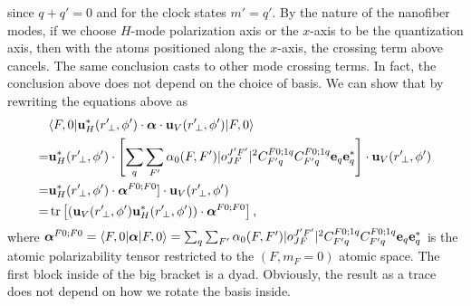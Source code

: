 \documentclass[preprint,aps,pra,onecolumn]{revtex4-1} %
\renewcommand{\tensor}[1]{\boldsymbol{#1}}
\begin{document}
since $q+q' = 0$ and for the clock states $m' = q'$. By the nature of the nanofiber modes, if we choose 
$H$-mode polarization axis or the $x$-axis to be the quantization axis, then with the atoms positioned 
along the $x$-axis, the crossing term above cancels. The same conclusion casts to other mode crossing 
terms. In fact, the conclusion above does not depend on the choice of basis. We can show that by 
rewriting the equations above as
\begin{align}
&\bra{F,0} \mathbf{u}^*_H(r^\prime\!_\perp, \phi') \cdot \tensor{\alpha} \cdot 
	\mathbf{u}_{V}(r^\prime\!_\perp, \phi') \ket{F,0}\nonumber\\
=& \mathbf{u}^*_H(r^\prime\!_\perp, 
 \phi')\cdot \left[  \sum_{q} \sum_{F'}\alpha_0(F,F') 
   |o^{J'F'}_{JF} |^2 C^{F 	0;1q}_{F' q} C^{F 0;1q}_{F' q}
     	  \mathbf{e}_q \mathbf{e}^*_{q}  \right]\cdot \mathbf{u}_V(r^\prime\!_\perp, \phi') \\
=& \mathbf{u}^*_H(r^\prime\!_\perp,  \phi')\cdot \boldsymbol{\alpha}^{F0;F0}]\cdot 
\mathbf{u}_V(r^\prime\!_\perp, \phi') \\
=& \tr\left[ \left(  \mathbf{u}_V(r^\prime\!_\perp, \phi')  \mathbf{u}^*_H(r^\prime\!_\perp,  \phi')\right)
\cdot  \boldsymbol{\alpha}^{F0;F0} \right],
\end{align}
where $  \boldsymbol{\alpha}^{F0;F0} = \langle{F,0}\rvert\boldsymbol{\alpha}\lvert{F,0}\rangle = \sum_{q} 
\sum_{F'}\alpha_0(F,F') 
   |o^{J'F'}_{JF} |^2 C^{F 	0;1q}_{F' q} C^{F 0;1q}_{F' q}
     	  \mathbf{e}_q \mathbf{e}^*_{q} $ is the atomic 
polarizability tensor restricted to the $ (F,m_F=0) $ atomic space. The first block inside of the big bracket 
is a dyad. Obviously, the result as a trace does not depend on how we rotate the basis inside. 
 
\end{document}
